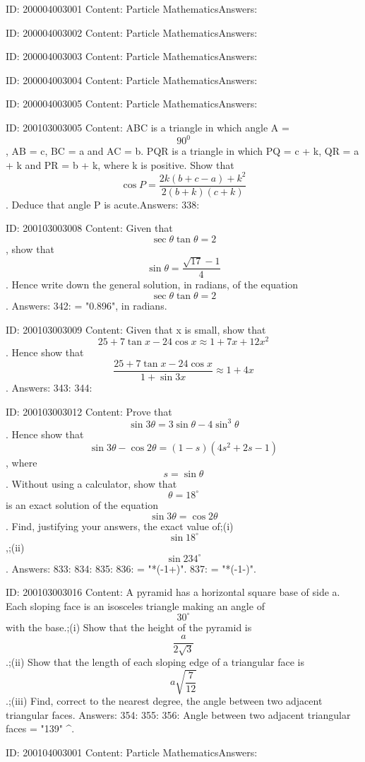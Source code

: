 \documentclass{article}
\begin{document}
ID: 200004003001
Content:
Particle MathematicsAnswers:

ID: 200004003002
Content:
Particle MathematicsAnswers:

ID: 200004003003
Content:
Particle MathematicsAnswers:

ID: 200004003004
Content:
Particle MathematicsAnswers:

ID: 200004003005
Content:
Particle MathematicsAnswers:

ID: 200103003005
Content:
ABC is a triangle in which angle A =  $$90^0 $$, AB = c, BC = a and AC = b. PQR is a triangle in which PQ = c + k, QR = a + k and PR = b + k, where k is positive. Show that  $$\cos P = \frac{2k( b + c - a ) + k^2}{2( b + k )( c + k )}$$. Deduce that angle P is acute.Answers:
338: 

ID: 200103003008
Content:
Given that  $$\sec \theta \tan \theta  = 2$$, show that  $$\sin \theta  = \frac{\sqrt{17}  - 1}{4}$$. Hence write down the general solution, in radians, of the equation  $$\sec \theta \tan \theta  = 2$$.  Answers:
342: \theta = "0.896", in radians.

ID: 200103003009
Content:
Given that x is small, show that  $$25 + 7\tan x - 24\cos x \approx 1 + 7x + 12x^2 $$. Hence show that  $$\frac{25 + 7\tan x - 24\cos x}{1 + \sin 3x} \approx 1 + 4x$$.  Answers:
343: 
344: 

ID: 200103003012
Content:
Prove that  $$\sin 3\theta  = 3\sin \theta  - 4\sin ^3 \theta $$. Hence show that  $$\sin 3\theta  - \cos 2\theta  = ( 1 - s )( 4s^2  + 2s - 1 )$$, where  $$s = \sin \theta $$. Without using a calculator, show that  $$\theta  = 18^{\circ} $$ is an exact solution of the equation  $$\sin 3\theta  = \cos 2\theta $$. Find, justifying your answers, the exact value of;(i)  $$\sin 18^{\circ} $$,;(ii)  $$\sin 234^{\circ} $$. Answers:
833: 
834: 
835: 
836:  = "*(-1+)".
837:  = "*(-1-)".

ID: 200103003016
Content:
A pyramid has a horizontal square base of side a. Each sloping face is an isosceles triangle making an angle of  $$30^{\circ}$$ with the base.;(i) Show that the height of the pyramid is  $$\frac{a}{2\sqrt 3}$$.;(ii) Show that the length of each sloping edge of a triangular face is  $$a\sqrt {\frac{7}{12}} $$.;(iii) Find, correct to the nearest degree, the angle between two adjacent triangular faces.  Answers:
354: 
355: 
356: Angle between two adjacent triangular faces = "139" ^{\circ}.

ID: 200104003001
Content:
Particle MathematicsAnswers:
\end{document}
